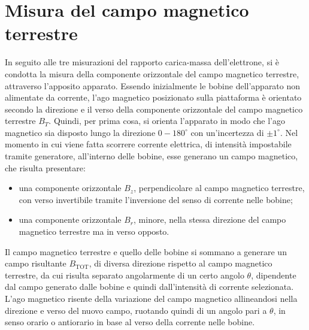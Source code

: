 \documentclass[a4paper,12pt]{article}
\begin{document}
\section{Misura del campo magnetico terrestre}

In seguito alle tre misurazioni del rapporto carica-massa dell’elettrone, si è condotta la misura della componente orizzontale del campo magnetico terrestre, attraverso l’apposito apparato.
Essendo inizialmente le bobine dell’apparato non alimentate da corrente, l’ago magnetico posizionato sulla piattaforma è orientato secondo la direzione e il verso della componente orizzontale del campo magnetico terrestre \( B_T \). Quindi, per prima cosa, si orienta l’apparato in modo che l’ago magnetico sia disposto lungo la direzione \( 0-180^\circ \) con un’incertezza di \( \pm 1^\circ \).
Nel momento in cui viene fatta scorrere corrente elettrica, di intensità impostabile tramite generatore, all’interno delle bobine, esse generano un campo magnetico, che risulta presentare:
\begin{itemize}
    \item una componente orizzontale \( B_z \), perpendicolare al campo magnetico terrestre, con verso invertibile tramite l’inversione del senso di corrente nelle bobine;
    \item una componente orizzontale \( B_r \), minore, nella stessa direzione del campo magnetico terrestre ma in verso opposto.
\end{itemize}

Il campo magnetico terrestre e quello delle bobine si sommano a generare un campo risultante \( B_{\text{TOT}} \), di diversa direzione rispetto al campo magnetico terrestre, da cui risulta separato angolarmente di un certo angolo \( \theta \), dipendente dal campo generato dalle bobine e quindi dall’intensità di corrente selezionata.
L’ago magnetico risente della variazione del campo magnetico allineandosi nella direzione e verso del nuovo campo, ruotando quindi di un angolo pari a \( \theta \), in senso orario o antiorario in base al verso della corrente nelle bobine.
\end{document}

